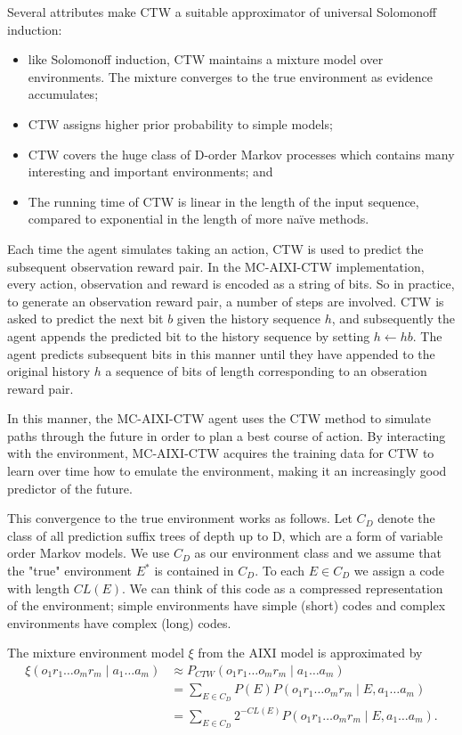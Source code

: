 \documentclass{article}
\theoremstyle{definition}
\newtheorem{primary statistics}[definition]{Primary Statistics}
\newtheorem{auxiliary statistics}[definition]{Auxiliary Statistics}
\begin{document}
Several attributes make CTW a suitable approximator of universal Solomonoff induction:
\begin{itemize}
\item like Solomonoff induction, CTW maintains a mixture model over environments. The mixture converges to the true environment as evidence accumulates;
\item CTW assigns higher prior probability to simple models;
\item CTW covers the huge class of D-order Markov processes which contains many interesting and important environments; and
\item The running time of CTW is linear in the length of the input sequence, compared to exponential in the length of more na\"ive methods.
\end{itemize}

Each time the agent simulates taking an action, CTW is used to predict the subsequent observation reward pair. In the MC-AIXI-CTW implementation, every action, observation and reward is encoded as a string of bits. So in practice, to generate an observation reward pair, a number of steps are involved. CTW is asked to predict the next bit $b$ given the history sequence $h$, and subsequently the agent appends the predicted bit to the history sequence by setting $h \gets hb$. The agent predicts subsequent bits in this manner until they have appended to the original history $h$ a sequence of bits of length corresponding to an obseration reward pair. 

 
In this manner, the MC-AIXI-CTW agent uses the CTW method to simulate paths through the future in order to plan a best course of action.  By interacting with the environment, MC-AIXI-CTW acquires the training data for CTW to learn over time how to emulate the environment, making it an increasingly good predictor of the future. 

This convergence to the true environment works as follows.
Let $C_D$ denote the class of all prediction suffix trees of depth up to D, which are a form of variable order Markov models. We use $C_D$ as our environment class and we assume that the "true" environment $E^*$ is contained in $C_D$. To each $E \in C_D$ we assign a code with length $CL(E)$. We can think of this code as a compressed representation of the environment; simple environments have simple (short) codes and complex environments have complex (long) codes.

The mixture environment model $\xi$ from the AIXI model is approximated by 
\begin{equation} \label{eq1}
\begin{split}
\xi (o_1r_1 \ldots o_mr_m \mid a_1 \ldots a_m) &\approx  P_{CTW}(o_1r_1 \ldots o_mr_m \mid a_1 \ldots a_m) \\
 & = \sum_{E \in C_D} P(E) P(o_1r_1 \ldots o_mr_m \mid E, a_1 \ldots a_m) \\ 
 & = \sum_{E \in C_D} 2^{-CL(E)} P(o_1r_1 \ldots o_mr_m \mid E, a_1 \ldots a_m).
\end{split}
\end{equation}
\end{document}
